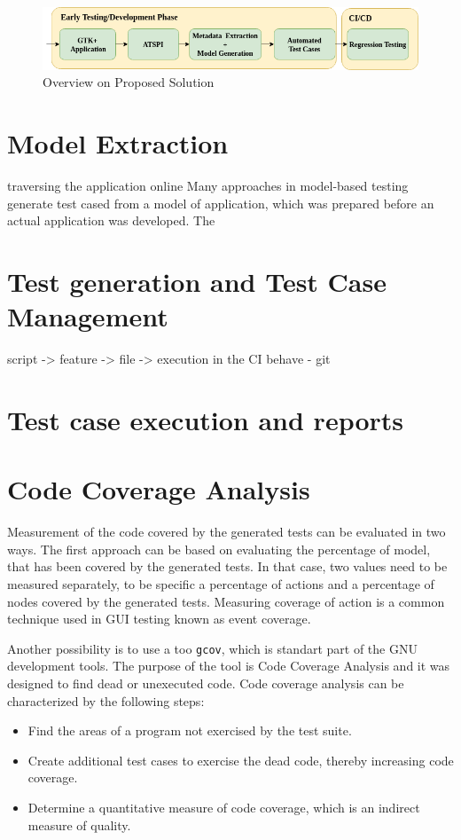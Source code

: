 \begin{figure}[hbt]
	\centering
	\includegraphics[width=1\textwidth]{obrazky-figures/diagram.png}
	\caption{Overview on Proposed Solution}
	\label{Diagram}
\end{figure}

\section{Model Extraction}
traversing the application online
Many approaches in model-based testing generate test cased from a model of application, which was prepared before an actual application was developed. The
\section{Test generation and Test Case Management}
script -> feature -> file -> execution in the CI
behave - git

\section{Test case execution and reports}
\section{Code Coverage Analysis}
Measurement of the code covered by the generated tests can be evaluated in two ways. 
The first approach can be based on evaluating the percentage of model, that has been covered by the generated tests. In that case, two values need to be measured separately, to be specific a percentage of actions and a percentage of nodes covered by the generated tests.
Measuring coverage of action is a common technique used in GUI testing known as event coverage.\cite{NguyenBao2014Gait}

Another possibility is to use a too \verb|gcov|, which is standart part of the GNU development tools. The purpose of the tool is Code Coverage Analysis and it was designed to find dead or unexecuted code. Code coverage analysis can be characterized by the following steps: 
\begin{itemize}
  \item Find the areas of a program not exercised by the test suite.
  \item Create additional test cases to exercise the dead code, thereby increasing code coverage.
  \item Determine a quantitative measure of code coverage, which is an indirect measure of quality.
\end{itemize}

